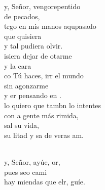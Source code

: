 \documentclass[12pt]{article}
\begin{document}
\begin{multicols*}{2}
\begin{cancion}%
	y, Señor, vengorepentido \\
	de  pecados,\\
	trgo en mis manos aqupasado\\
	que  quisiera \\
	y tal  pudiera olvir.\\
\jump
	isiera dejar de otarme \\
	y  la cara\\
	co Tú haces, irr el mundo\\
	sin agonzarme \\
	y er pensando en .\\
\jump
	lo quiero que tambn lo intentes\\
	con a gente más rimida, \\
	sal su vida,\\
	su litad y sa de veras am.\\\jump\\
	\begin{chorus}%
	y, Señor, ayúe, or,  \\
	pues seo cami\\
	hay miendas que elr, guíe.\\
	\end{chorus}%
	\jump\\
\end{cancion}%


\end{multicols*}
\end{document}
